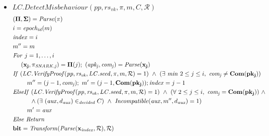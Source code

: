 \begin{itemize}
\item $\mathit{LC.DetectMisbehaviour}(\mathit{pp}, \mathit{rs_{\mathit{vk}}}, \pi, m, C, \mathcal{R})$
\begin{align*}
& (\mathbf{\Pi}, \mathbf{\Sigma}) = \mathit{Parse}(\pi)  \\
& i = \mathit{epoch_{id}}(m) \\
& \mathit {index} = i \\
& m'' = m \\
& \mathit{For} \ j = 1, \ldots, i \\
& \ \ \ \ (\mathbf{x_j}, \mathit{\pi_{\mathit{SNARK},j}}) = \mathbf{\Pi}(j); \ (\mathit{apk_j}, \mathit{com_j}) = \mathit{Parse}(\mathbf{x_j}) \\
& \mathit{If} \ (\mathit{LC.VerifyProof}(\mathit{pp}, \mathit{rs_{\mathit{vk}}}, \LCseed, \pi, m, \mathcal{R}) = 1) \ \wedge \  ( \exists \ \mathit{min} \ 2 \leq j \leq i, \ \mathit{com_j} \neq \mathbf{Com}(\mathbf{pk_j}))\\ %
& \ \ \ \ \ \ \ m'' = (j-1,\mathit{com_j}); \ m' = (j-1, \mathbf{Com}(\mathbf{pk_j})); \mathit{index} = j-1\\
& \mathit{ElseIf} \ (\mathit{LC.VerifyProof}(\mathit{pp}, \mathit{rs_{\mathit{vk}}}, \LCseed, \pi, m, \mathcal{R}) = 1) \  \wedge \ (\forall \ 2 \leq j \leq i, \ \mathit{com_j} = \mathbf{Com}(\mathbf{pk_j})) \ \wedge \\ 
& \hspace{1cm} \wedge (\exists \ (\mathit{aux}, d_{\mathit{aux}}) \in_{\mathit{decided}} C) \ \wedge \ \mathit{Incompatible}(\mathit{aux}, m'',  d_{\mathit{aux}})=1) \\
& \ \ \ \ \ \ \ m' =   \mathit{aux}\\
&\mathit{Else} \ \mathit{Return} \\
& \mathbf{bit} = \mathit{Transform}(\mathit{Parse}(\mathbf{x_{\mathit{index}}}, \mathcal{R}), \mathcal{R}) \\

\end{align*}
\end{itemize}
